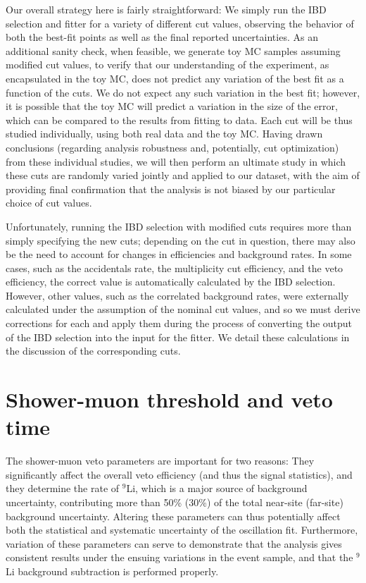 \documentclass[../thesis.tex]{subfiles}
\begin{document}
Our overall strategy here is fairly straightforward: We simply run the IBD selection and fitter for a variety of different cut values, observing the behavior of both the best-fit points as well as the final reported uncertainties. As an additional sanity check, when feasible, we generate toy MC samples assuming modified cut values, to verify that our understanding of the experiment, as encapsulated in the toy MC, does not predict any variation of the best fit as a function of the cuts. We do not expect any such variation in the best fit; however, it is possible that the toy MC will predict a variation in the size of the error, which can be compared to the results from fitting to data. Each cut will be thus studied individually, using both real data and the toy MC\@. Having drawn conclusions (regarding analysis robustness and, potentially, cut optimization) from these individual studies, we will then perform an ultimate study in which these cuts are randomly varied jointly and applied to our dataset, with the aim of providing final confirmation that the analysis is not biased by our particular choice of cut values.

Unfortunately, running the IBD selection with modified cuts requires more than simply specifying the new cuts; depending on the cut in question, there may also be the need to account for changes in efficiencies and background rates. In some cases, such as the accidentals rate, the multiplicity cut efficiency, and the veto efficiency, the correct value is automatically calculated by the IBD selection. However, other values, such as the correlated background rates, were externally calculated under the assumption of the nominal cut values, and so we must derive corrections for each and apply them during the process of converting the output of the IBD selection into the input for the fitter. We detail these calculations in the discussion of the corresponding cuts.

\section{Shower-muon threshold and veto time}
\label{sec:cutVaryShowerMuon}

The shower-muon veto parameters are important for two reasons: They significantly affect the overall veto efficiency (and thus the signal statistics), and they determine the rate of $^9$Li, which is a major source of background uncertainty, contributing more than 50\% (30\%) of the total near-site (far-site) background uncertainty. Altering these parameters can thus potentially affect both the statistical and systematic uncertainty of the oscillation fit. Furthermore, variation of these parameters can serve to demonstrate that the analysis gives consistent results under the ensuing variations in the event sample, and that the $^9$Li background subtraction is performed properly.
\end{document}
